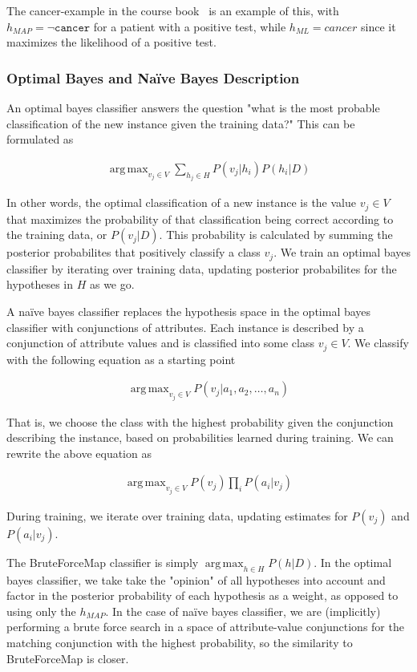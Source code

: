 \documentclass[paper=a4, fontsize=11pt]{scrartcl} %
\numberwithin{equation}{section} %
\numberwithin{figure}{section} %
\numberwithin{table}{section} %
\DeclareMathOperator*{\argmax}{arg\,max}
\begin{document}
The cancer-example in the course book~\cite[p. 158]{bib:mitchell} is an example of this, with $h_{MAP} = \neg \texttt{cancer}$ for a patient with a positive test, while $h_{ML} = cancer$ since it maximizes the likelihood of a positive test.

\subsubsection{Optimal Bayes and Naïve Bayes Description}

An optimal bayes classifier answers the question "what is the most probable classification of the new instance given the training data?"
This can be formulated as

\begin{gather*}
    \argmax_{v_j \in V} \sum_{h_j \in H} P(v_j|h_i)P(h_i|D)
\end{gather*}

In other words, the optimal classification of a new instance is the value $v_j \in V$ that maximizes the probability of that classification being correct according to the training data, or $P(v_j|D)$.
This probability is calculated by summing the posterior probabilites that positively classify a class $v_j$.
We train an optimal bayes classifier by iterating over training data, updating posterior probabilites for the hypotheses in $H$ as we go.

A naïve bayes classifier replaces the hypothesis space in the optimal bayes classifier with conjunctions of attributes.
Each instance is described by a conjunction of attribute values and is classified into some class $v_j \in V$.
We classify with the following equation as a starting point

\begin{gather*}
    \argmax_{v_j \in V} P(v_j|a_1, a_2,…,a_n)
\end{gather*}

That is, we choose the class with the highest probability given the conjunction describing the instance, based on probabilities learned during training.
We can rewrite the above equation as

\begin{gather*}
    \argmax_{v_j \in V} P(v_j)\prod_{i} P(a_i|v_j)
\end{gather*}

During training, we iterate over training data, updating estimates for $P(v_j)$ and $P(a_i|v_j)$.

The BruteForceMap classifier is simply $\argmax_{h \in H} P(h|D)$.
In the optimal bayes classifier, we take take the "opinion" of all hypotheses into account and factor in the posterior probability of each hypothesis as a weight, as opposed to using only the $h_{MAP}$.
In the case of naïve bayes classifier, we are (implicitly) performing a brute force search in a space of attribute-value conjunctions for the matching conjunction with the highest probability, so the similarity to BruteForceMap is closer.
\end{document}
